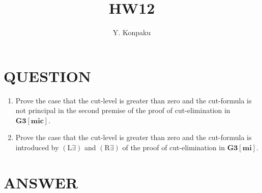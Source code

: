 \documentclass[12pt]{article}
\newcommand\PC[1]{\mathbf{#1}}
\newcommand\LX{\textrm{L$\exists$}}
\newcommand\RX{\textrm{R$\exists$}}
\begin{document}
\title{HW12}
\author{Y. Konpaku}

\maketitle

\section{QUESTION}
\begin{enumerate}
\item Prove the case that the cut-level is greater than zero and the cut-formula is not principal in the second premise of the proof of cut-elimination in $\PC{G3[mic]}$.
\item Prove the case that the cut-level is greater than zero and the cut-formula is introduced by $(\LX)$ and $(\RX)$ of the proof of cut-elimination in $\PC{G3[mi]}$.
\end{enumerate}

\section{ANSWER}
\end{document}
